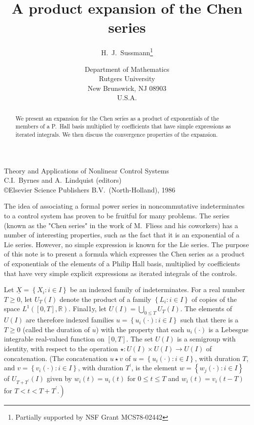 \documentclass[leqno]{article}
\title{A product expansion of the Chen series}
\author{H.\ J.\ Sussmann\footnote{Partially supported by NSF Grant MCS78-02442}}
\date{
	Department of Mathematics\\
	Rutgers University \\
	New Brunswick, NJ 08903 \\	
	U.S.A.
}
\theoremstyle{plain}
\begin{document}
	
\noindent
Theory and Applications of Nonlinear Control Systems \\
C.I.\ Byrnes and A.\ Lindquist (editors) \\
\copyright Elsevier Science Publishers B.V.\ (North-Holland), 1986

{\let\newpage\relax\maketitle}

\maketitle

\renewcommand*\abstractname{}

\begin{abstract}
	We present an expansion for the Chen series as a product of exponentials of the members of a P.\ Hall basis multiplied by coefficients that have simple expressions as iterated integrals. We then discuss the convergence properties of the expansion.
\end{abstract}

\bigskip

The idea of associating a formal power series in noncommutative indeterminates to a control system has proven to be fruitful for many problems. The series (known as the "Chen series" in the work of M.\ Fliess and his coworkers) has a number of interesting properties, such as the fact that it is an exponential of a Lie series. However, no simple expression is known for the Lie series. The purpose of this note is to present a formula which expresses the Chen series as a product of exponentials of the elements of a Philip Hall basis, multiplied by coefficients that have very simple explicit expressions as iterated integrals of the controls.

Let $\underline{X}=\left\{X_{i}: i \in I\right\}$ be an indexed family of indeterminates. For a real number $T \geq 0$, let $U_{T}(I)$ denote the product of a family $\left\{L_{i}: i \in I\right\}$ of copies of the space $L^1([0, T], \mathbb{R})$. Final1y, let $U(I)=\bigcup_{0 \leq T} U_{T}(I)$. The elements of $U(I)$ are therefore indexed families $u=\left\{u_{i}(\cdot): i \in I\right\}$ such that there is a $T \geq 0$ (called the duration of $u$) with the property that each $u_{i}(\cdot)$ is a Lebesgue integrable real-valued function on $[0, T]$. The set $U(I)$ is a semigroup with identity, with respect to the operation $\star: U(I) \times U(I) \rightarrow U(I)$ of concatenation. (The concatenation $u \star v$ of $u=\left\{u_{i}(\cdot): i \in I\right\}$, with duration $T$, and $v=\left\{v_{i}(\cdot): i \in I\right\}$, with duration $T^{\prime}$, is the element $w=\left\{w_{j}(\cdot): i \in I\right\}$ of $U_{T+T^{\prime}}(I)$ given by $w_{i}(t)=u_{i}(t)$ for $0 \leq t \leq T$ and $w_{i}(t)=v_{i}(t-T)$ for $\left.T<t<T+T^{\prime} .\right)$
\end{document}
